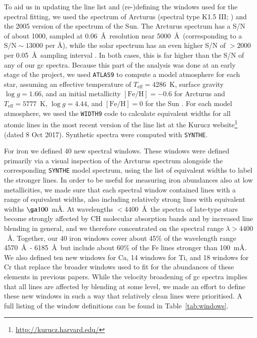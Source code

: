 \documentclass{aa}
\begin{document}
To aid us in updating the line list and (re-)defining the windows used for the spectral fitting,  
we used the \citet{Wallace2000} spectrum of Arcturus (spectral type K1.5 III; \citealt{Keenan1989})
and the 2005 version of the \citet{Kurucz1984} spectrum of the Sun. The Arcturus spectrum has a S/N of about 1000, sampled at 0.06~\AA\ resolution near 5000~\AA\ (corresponding to a $\mathrm{S/N}\sim13000$ per \AA), while the solar spectrum has an even higher S/N of $>2000$ per 0.05~\AA\ sampling interval \citep{Furenlid1988}. In both cases, this is far higher than the S/N of any of our \ac{gc} spectra.
Because this part of the analysis was done at an early stage of the project, we used \texttt{ATLAS9} to compute a model atmosphere for each star, assuming an effective temperature of $T_\mathrm{eff}=4286$~K, surface gravity  $\log g = 1.66$, and an initial metallicity $\mathrm{[Fe/H]}=-0.6$ for Arcturus \citep{Worley2009,Ramirez2011} and $T_\mathrm{eff}=5777$~K, 
$\log g = 4.44$, and $\mathrm{[Fe/H]}=0$ for the Sun \citep{Cox2000}.
For each model atmosphere, we used the \texttt{WIDTH9} code \citep{Castelli2005,Kurucz2005} to calculate equivalent widths for all atomic lines in the most recent version of the line list at the Kurucz website\footnote{\url{http://kurucz.harvard.edu/}} (dated 8 Oct 2017). 
Synthetic spectra were computed with \texttt{SYNTHE}.

For iron we defined 40 new spectral windows. These windows were defined primarily via a visual inspection of the Arcturus spectrum alongside the corresponding \texttt{SYNTHE} model spectrum, using the list of equivalent widths to label the stronger lines. In order to be useful for measuring iron abundances also at low metallicities, we made sure that each spectral window contained lines with a range of equivalent widths, also including relatively strong lines with equivalent widths  $\ga100$~m\AA . 
At wavelengths $<4400$~\AA\ the spectra of late-type stars become strongly affected by CH molecular absorption bands and by increased line blending in general, and we therefore concentrated on the spectral range $\lambda > 4400$~\AA .  Together, our 40 iron windows cover about 45\% of the wavelength range 4570~\AA\ - 6185~\AA\ but include about 60\% of the Fe lines stronger than 100~m\AA .  
We also defined ten new windows for Ca, 14 windows for Ti, and 18 windows for Cr that replace the broader windows used to fit for the abundances of these elements in previous papers. While the velocity broadening of \ac{gc} spectra implies that all lines are affected by blending at some level, we made an effort to define these new windows in such a way that relatively clean lines were prioritised. A full listing of the window definitions can be found in Table~\ref{tab:windows}. 
\end{document}
